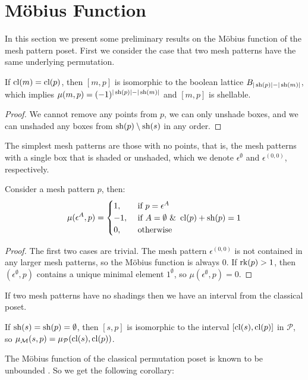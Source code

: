 \documentclass[11pt,a4paper,oneside]{article}
\begin{document}
\section{M\"obius Function}
In this section we present some preliminary results on the M\"obius function of the mesh pattern poset.
First we consider the case that two mesh patterns have the same underlying
permutation.
\begin{lem}
If $\operatorname{\textrm{cl}}(m)=\operatorname{\textrm{cl}}(p)$, then $[m,p]$ is isomorphic to the boolean lattice
$B_{|\operatorname{\textrm{sh}}(p)|-|\operatorname{\textrm{sh}}(m)|}$, which implies $\mu(m,p)=(-1)^{|\operatorname{\textrm{sh}}(p)|-|\operatorname{\textrm{sh}}(m)|}$ and
$[m,p]$ is shellable.
\begin{proof}
We cannot remove any points from $p$, we can only unshade boxes, and we can
unshaded any boxes from $\operatorname{\textrm{sh}}(p)\setminus\operatorname{\textrm{sh}}(s)$ in any order.
\end{proof}
\end{lem}

The simplest mesh patterns are those with no points, that is, the mesh patterns
with a single box that is shaded or unshaded, which we denote
$\epsilon^\emptyset$ and $\epsilon^{(0,0)}$, respectively.
\begin{lem}
Consider a mesh pattern $p$, then:
$$\mu(\epsilon^{A},p)=\begin{cases}
1,&\mbox{ if }p=\epsilon^A \\
-1,&\mbox{ if }A=\emptyset\,\,\&\,\,\operatorname{\textrm{cl}}(p)+\operatorname{\textrm{sh}}(p)=1\\
0,&\mbox{ otherwise}
\end{cases}$$
\begin{proof}
The first two cases are trivial. The
mesh pattern $\epsilon^{(0,0)}$ is not contained in any larger mesh patterns, so
the M\"obius function is always $0$. If $\operatorname{\textrm{rk}}(p)>1$, then
$(\epsilon^\emptyset,p)$ contains a unique minimal element $1^\emptyset$, so
$\mu(\epsilon^\emptyset,p)=0$.
\end{proof}
\end{lem}

If two mesh patterns have no shadings then we have an interval from the
classical poset.

\begin{lem}
If $\operatorname{\textrm{sh}}(s)=\operatorname{\textrm{sh}}(p)=\emptyset$, then $[s,p]$ is isomorphic to the interval
$[\operatorname{\textrm{cl}}(s),\operatorname{\textrm{cl}}(p)]$ in $\mathcal{P}$, so $\operatorname{\mu_\mathcal{M}}(s,p)=\operatorname{\mu_\mathcal{P}}(\operatorname{\textrm{cl}}(s),\operatorname{\textrm{cl}}(p))$.
\end{lem}

The M\"obius function of the classical permutation poset is known to be
unbounded \cite{Smith13}. So we get the following corollary:
\end{document}
